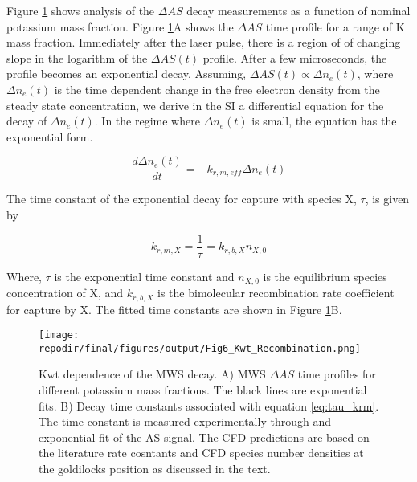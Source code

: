 Figure \ref{fig:kwt_recombination} shows analysis of the $\Delta AS$ decay measurements as a function of nominal potassium mass fraction.  Figure \ref{fig:kwt_recombination}A shows the $\Delta AS$ time profile for a range of K mass fraction. Immediately after the laser pulse, there is a region of of changing slope in the logarithm of the $\Delta AS (t)$ profile. After a few microseconds, the profile becomes an exponential decay. Assuming, $\Delta AS (t) \propto \Delta n_e (t)$, where $\Delta n_e (t)$ is the time dependent change in the free electron density from the steady state concentration, we derive in the SI a differential equation for the decay of $\Delta n_e (t)$. In the regime where $\Delta n_e (t)$ is small, the equation has the exponential form.  

\begin{equation}
    \label{eq:fit_eq}
    \frac{d\Delta n_e (t)}{dt} = - k_{r, m, eff} \Delta n_e (t) 
\end{equation}

The time constant of the exponential decay for capture with species X, $\tau$, is given by

\begin{equation}
    \label{eq:tau_krm}
    k_{r, m, X} = \frac{1}{\tau} = k_{r, b, X}n_{X,0}
\end{equation}

Where, $\tau$ is the exponential time constant and $n_{X,0}$ is the equilibrium species concentration of X, and $k_{r, b, X}$ is the bimolecular recombination rate coefficient for capture by X. The fitted time constants are shown in Figure \ref{fig:kwt_recombination}B.


\begin{figure}[h]
    \texttt{[image: \\repodir/final/figures/output/Fig6\_Kwt\_Recombination.png]} 
    \centering
    \caption{Kwt dependence of the MWS decay. A) MWS $\Delta AS$ time profiles for different potassium mass fractions. The black lines are exponential fits. B) Decay time constants associated with equation \ref{eq:tau_krm}. The time constant is measured experimentally through and exponential fit of the AS signal. The CFD predictions are based on the literature rate cosntants and CFD species number densities at the goldilocks position as discussed in the text.  }
    \label{fig:kwt_recombination}
\end{figure}



